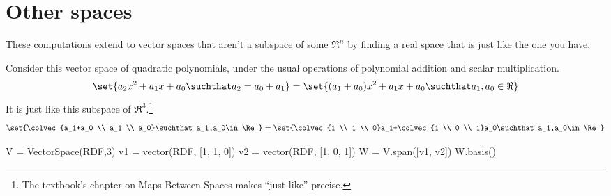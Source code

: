 \section{Other spaces}

These computations extend to
vector spaces that aren't a subspace of some $\Re^n$
by finding a real space that is just like the one you have.

Consider this vector space of quadratic polynomials,
under the usual operations of polynomial addition and scalar multiplication.
\begin{equation*}
  \set{ a_2x^2+a_1x+a_0\suchthat a_2=a_0+a_1}           
   =\set{ (a_1+a_0)x^2+a_1x+a_0 \suchthat a_1,a_0\in\Re}
\end{equation*}
It is just like
this subspace of $\Re^3$.\footnote{The textbook's chapter on Maps Between Spaces makes 
``just like'' precise.}
\begin{equation*}
  \set{\colvec{a_1+a_0 \\ a_1 \\ a_0}\suchthat a_1,a_0\in\Re}
  =\set{\colvec{1 \\ 1 \\ 0}a_1+\colvec{1 \\ 0 \\ 1}a_0\suchthat a_1,a_0\in\Re}
\end{equation*}
\begin{sageoutput}
V = VectorSpace(RDF,3)
v1 = vector(RDF, [1, 1, 0])
v2 = vector(RDF, [1, 0, 1])
W = V.span([v1, v2])
W.basis()
\end{sageoutput}


